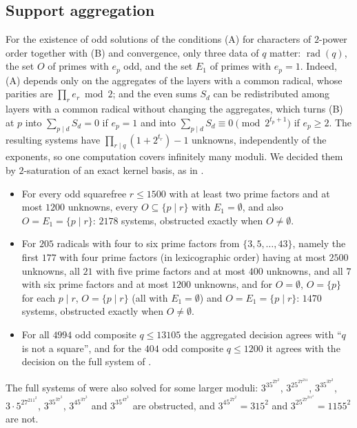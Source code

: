 \documentclass[11pt]{amsart}
\theoremstyle{definition}
\theoremstyle{remark}
\DeclareMathOperator{\rad}{rad}
\numberwithin{equation}{section}
\begin{document}
\subsection{Support aggregation}
For the existence of odd solutions of the conditions (A) for characters of $2$-power order together with (B) and convergence, only three data of $q$ matter: $\rad(q)$, the set $O$ of primes with $e_p$ odd, and the set $E_1$ of primes with $e_p=1$.
Indeed, (A) depends only on the aggregates of the layers with a common radical, whose parities are $\prod_re_r\bmod2$; and the even sums $S_d$ can be redistributed among layers with a common radical without changing the aggregates, which turns (B) at $p$ into $\sum_{p\mid d}S_d=0$ if $e_p=1$ and into $\sum_{p\mid d}S_d\equiv0\pmod{2^{t_p+1}}$ if $e_p\ge2$.
The resulting systems have $\prod_{r\mid q}(1+2^{t_r})-1$ unknowns, independently of the exponents, so one computation covers infinitely many moduli.
We decided them by $2$-saturation of an exact kernel basis, as in \cite[Lemma~4.3]{Kei26}.
\begin{itemize}
\item For every odd squarefree $r\le1500$ with at least two prime factors and at most $1200$ unknowns, every $O\subseteq\{p\mid r\}$ with $E_1=\emptyset$, and also $O=E_1=\{p\mid r\}$: $2178$ systems, obstructed exactly when $O\neq\emptyset$.
\item For $205$ radicals with four to six prime factors from $\{3,5,\dots,43\}$, namely the first $177$ with four prime factors (in lexicographic order) having at most $2500$ unknowns, all $21$ with five prime factors and at most $400$ unknowns, and all $7$ with six prime factors and at most $1200$ unknowns, and for $O=\emptyset$, $O=\{p\}$ for each $p\mid r$, $O=\{p\mid r\}$ (all with $E_1=\emptyset$) and $O=E_1=\{p\mid r\}$: $1470$ systems, obstructed exactly when $O\neq\emptyset$.
\item For all $4994$ odd composite $q\le13105$ the aggregated decision agrees with ``$q$ is not a square'', and for the $404$ odd composite $q\le1200$ it agrees with the decision on the full system of \cite[Thm.~4.5]{Kei26}.
\end{itemize}
The full systems of \cite[Thm.~4.5]{Kei26} were also solved for some larger moduli: $3^35^27^2$, $3^25^27^211$, $3^35^37^2$, $3\cdot5^27^211^2$, $3^35^37^3$, $3^45^37^3$ and $3^35^47^3$ are obstructed, and $3^45^27^2=315^2$ and $3^25^27^211^2=1155^2$ are not.
\end{document}
